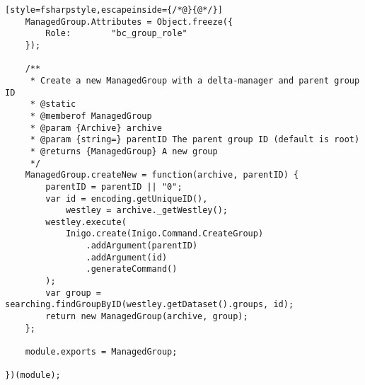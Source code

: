\begin{lstlisting}[style=fsharpstyle,escapeinside={/*@}{@*/}]
    ManagedGroup.Attributes = Object.freeze({
        Role:        "bc_group_role"
    });

    /**
     * Create a new ManagedGroup with a delta-manager and parent group ID
     * @static
     * @memberof ManagedGroup
     * @param {Archive} archive
     * @param {string=} parentID The parent group ID (default is root)
     * @returns {ManagedGroup} A new group
     */
    ManagedGroup.createNew = function(archive, parentID) {
        parentID = parentID || "0";
        var id = encoding.getUniqueID(),
            westley = archive._getWestley();
        westley.execute(
            Inigo.create(Inigo.Command.CreateGroup)
                .addArgument(parentID)
                .addArgument(id)
                .generateCommand()
        );
        var group = searching.findGroupByID(westley.getDataset().groups, id);
        return new ManagedGroup(archive, group);
    };

    module.exports = ManagedGroup;

})(module);
\end{lstlisting}